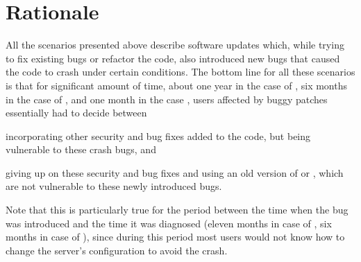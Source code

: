\section{Rationale}
\label{multi-version:rationale}



All the scenarios presented above describe software updates which, while trying
to fix existing bugs or refactor the code, also introduced new bugs that caused
the code to crash under certain conditions. The bottom line for all these
scenarios is that for significant amount of time, \ie about one year in the
case of \lighttpd, six months in the case of \redis, and one month in the case
\vim, users affected by buggy patches essentially had to decide between%
\begin{inparaenum}[(1)]
\item incorporating other security and bug fixes added to the code, but being
  vulnerable to these crash bugs, and
\item giving up on these security and bug fixes and using an old version of
  \lighttpd or \redis, which are not vulnerable to these newly introduced bugs.
\end{inparaenum}
Note that this is particularly true for the period between the time when the
bug was introduced and the time it was diagnosed (\ie eleven months in case of
\lighttpd, six months in case of \redis), since during this period most users
would not know how to change the server's configuration to avoid the crash.

